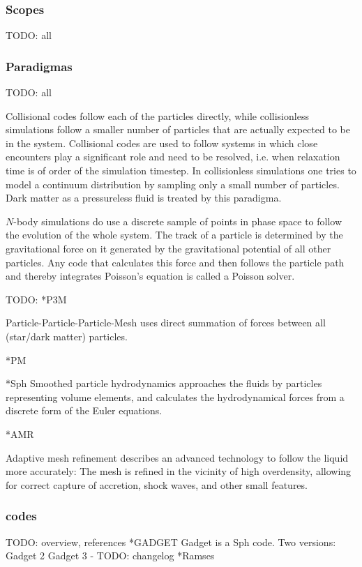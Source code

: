 \documentclass[useAMS,usenatbib]{mn2e}
\begin{document}
\subsubsection{Scopes}
TODO: all
\subsubsection{Paradigmas}
TODO: all

Collisional codes follow each of the particles directly, while
collisionless simulations follow a smaller number of particles that
are actually expected to be in the system. Collisional codes are used
to follow systems in which close encounters play a significant role
and need to be resolved, i.e. when relaxation time is of order of the
simulation timestep. In collisionless simulations one tries to model a
continuum distribution by sampling only a small number of
particles. Dark matter as a pressureless fluid is treated by this
paradigma.

$N$-body simulations do use a discrete sample of points in phase space
to follow the evolution of the whole system. The track of a particle
is determined by the gravitational force on it generated by the
gravitational potential of all other particles. Any code that
calculates this force and then follows the particle path and thereby
integrates Poisson's equation is called a Poisson solver.

TODO:
*P3M

Particle-Particle-Particle-Mesh uses direct summation of forces
between all (star/dark matter) particles.

*PM

*{\sc Sph} Smoothed particle hydrodynamics approaches the fluids by
particles representing volume elements, and calculates the
hydrodynamical forces from a discrete form of the Euler equations.

*AMR

Adaptive mesh refinement describes an advanced technology to follow
the liquid more accurately: The mesh is refined in the vicinity of
high overdensity, allowing for correct capture of accretion, shock
waves, and other small features.

\subsubsection{codes}
TODO: overview, references
*GADGET
{\sc Gadget} is a {\sc Sph} code.
Two versions:
Gadget 2
Gadget 3
- TODO: changelog
*{\sc Ramses}
\end{document}
